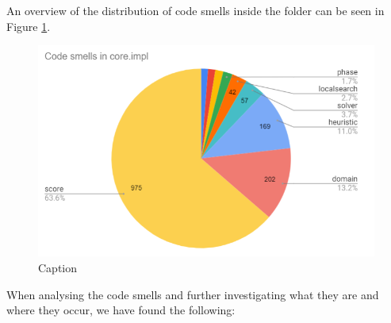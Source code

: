             An overview of the distribution of code smells inside the  folder can be seen in Figure \ref{fig:codesmellimpl}.
            \begin{figure}[H]
                \centering
                \includegraphics[scale=0.8]{figures/step4/codesmellsimpl.PNG}
                \caption{Caption}
                \label{fig:codesmellimpl}
            \end{figure}
            When analysing the code smells and further investigating what they are and where they occur, we have found the following: 
